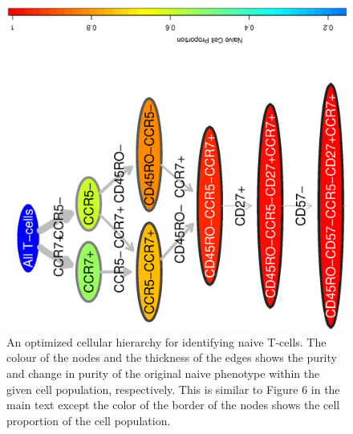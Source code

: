 
  \begin{figure}[!ht]
    \begin{center}
      \includegraphics[width=\textwidth, angle=270]{figs/rchy/figs/PropNaiveOverlap}
    \end{center}
    \caption{An optimized cellular hierarchy for identifying naive T-cells. The colour of the nodes and the thickness of the edges shows the purity and change in purity of the original naive phenotype within the given cell population, respectively.
      This is similar to Figure 6 in the main text except the color of the border of the nodes shows the cell proportion of the cell population.
    }
    \label{r1:NaiveOverlapProp}
  \end{figure}

